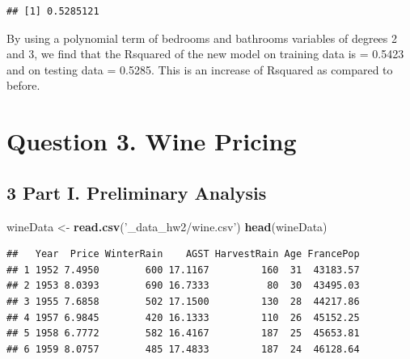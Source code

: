 \documentclass[
]{article}
\newenvironment{Shaded}{\begin{snugshade}}{\end{snugshade}}
\newcommand{\DataTypeTok}[1]{\textcolor[rgb]{0.13,0.29,0.53}{#1}}
\newcommand{\DecValTok}[1]{\textcolor[rgb]{0.00,0.00,0.81}{#1}}
\newcommand{\KeywordTok}[1]{\textcolor[rgb]{0.13,0.29,0.53}{\textbf{#1}}}
\newcommand{\NormalTok}[1]{#1}
\newcommand{\OperatorTok}[1]{\textcolor[rgb]{0.81,0.36,0.00}{\textbf{#1}}}
\newcommand{\StringTok}[1]{\textcolor[rgb]{0.31,0.60,0.02}{#1}}
\begin{document}
\begin{verbatim}
## [1] 0.5285121
\end{verbatim}

By using a polynomial term of bedrooms and bathrooms variables of
degrees 2 and 3, we find that the Rsquared of the new model on training
data is = 0.5423 and on testing data = 0.5285. This is an increase of
Rsquared as compared to before.

\hypertarget{question-3.-wine-pricing}{%
\section{Question 3. Wine Pricing}\label{question-3.-wine-pricing}}

\hypertarget{part-i.-preliminary-analysis}{%
\subsection{3 Part I. Preliminary
Analysis}\label{part-i.-preliminary-analysis}}

\begin{Shaded}
\begin{Highlighting}[]
\NormalTok{wineData <-}\StringTok{ }\KeywordTok{read.csv}\NormalTok{(}\StringTok{'_data_hw2/wine.csv'}\NormalTok{)}
\KeywordTok{head}\NormalTok{(wineData)}
\end{Highlighting}
\end{Shaded}

\begin{verbatim}
##   Year  Price WinterRain    AGST HarvestRain Age FrancePop
## 1 1952 7.4950        600 17.1167         160  31  43183.57
## 2 1953 8.0393        690 16.7333          80  30  43495.03
## 3 1955 7.6858        502 17.1500         130  28  44217.86
## 4 1957 6.9845        420 16.1333         110  26  45152.25
## 5 1958 6.7772        582 16.4167         187  25  45653.81
## 6 1959 8.0757        485 17.4833         187  24  46128.64
\end{verbatim}

\begin{Shaded}
\end{Shaded}
\end{document}
